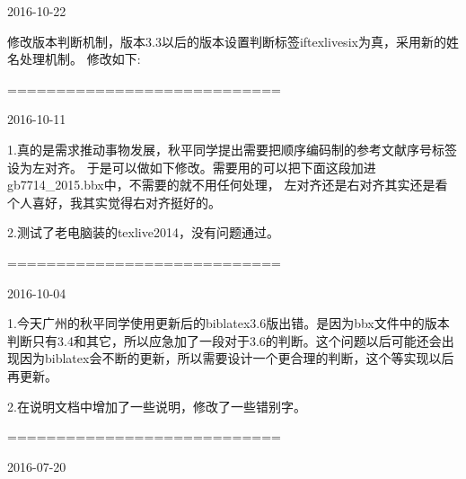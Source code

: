 \documentclass[11pt]{article} %
\begin{document}
2016-10-22

修改版本判断机制，版本3.3以后的版本设置判断标签iftexlivesix为真，采用新的姓名处理机制。
修改如下:


============================

2016-10-11

1.真的是需求推动事物发展，秋平同学提出需要把顺序编码制的参考文献序号标签设为左对齐。
于是可以做如下修改。需要用的可以把下面这段加进gb7714\_2015.bbx中，不需要的就不用任何处理，
左对齐还是右对齐其实还是看个人喜好，我其实觉得右对齐挺好的。
\begin{texlist}
\end{texlist}

2.测试了老电脑装的texlive2014，没有问题通过。


============================

2016-10-04

1.今天广州的秋平同学使用更新后的biblatex3.6版出错。是因为bbx文件中的版本判断只有3.4和其它，所以应急加了一段对于3.6的判断。这个问题以后可能还会出现因为biblatex会不断的更新，所以需要设计一个更合理的判断，这个等实现以后再更新。

2.在说明文档中增加了一些说明，修改了一些错别字。

============================

2016-07-20
\end{document}
